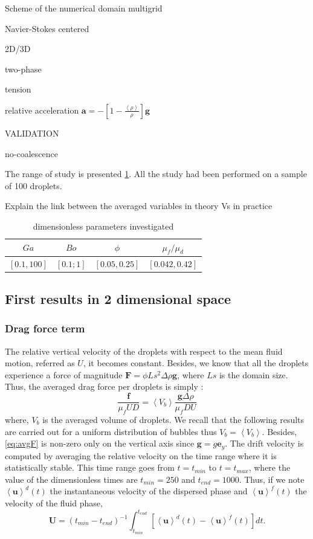 Scheme of the numerical domain
multigrid 

Navier-Stokes centered 

2D/3D

two-phase

tension

relative acceleration $\bm{a} = - \left[1-\frac{\left<\rho\right>}{\rho}\right]\bm{g}$

VALIDATION

no-coalescence

The range of study is presented \ref{tab:dim}. 
All the study had been performed on a sample of 100 droplets. 

Explain the link between the averaged variables in theory Vs in practice
\begin{table}[h!]
    \centering
    \begin{tabular}{||c|c|c|c||}
        \hline$Ga$&$Bo$&$\phi$&$\mu_f/\mu_d$\\ \hline
        $[0.1,100]$&$[0.1;1]$&$[0.05,0.25]$&$[0.042,0.42]$\\ \hline
    \end{tabular}
    \caption{dimensionless parameters investigated}
    \label{tab:dim}
\end{table}

 


\subsection{First results in 2 dimensional space}

\subsubsection{Drag force term}
The relative vertical velocity of the droplets with respect to the mean fluid motion, referred as $U$, it becomes constant.
Besides, we know that all the droplets experience a force of magnitude $\bm{F} = \phi Ls^2 \Delta \rho \bm{g}$, where $Ls$ is the domain size.
Thus, the averaged drag force per droplets is simply :
\begin{equation}
    \frac{\bm{f}}{\mu_f UD} = \left<V_b\right>\frac{\bm{g}\Delta \rho }{\mu_f D U}
    \label{eq:avgF}
\end{equation}  
where, $V_b$ is the averaged volume of droplets. 
We recall that the following results are carried out for a uniform distribution of bubbles thus $V_b = \left<V_b\right>$.
Besides, \ref{eq:avgF} is non-zero only on the vertical axis since $\bm{g} = g \bm{e}_y$. 
The drift velocity is computed by averaging the relative velocity on the time range where it is statistically stable.
This time range goes from $t = t_{min}$ to $t = t_{max}$, where the value of the dimensionless times are $t_{min} = 250$ and $t_{end} = 1000$. 
Thus, if we note $\left<\bm{u}\right>^d(t)$ the instantaneous velocity of the dispersed phase and $\left<\bm{u}\right>^f(t)$ the velocity of the fluid phase,
\begin{equation}
    \bm{U} =\left(t_{min}-t_{end}\right)^{-1}\int_{t_{min}}^{t_{end}}\left[\left<\bm{u}\right>^d(t)-\left<\bm{u}\right>^f(t)\right] dt.
\end{equation}

